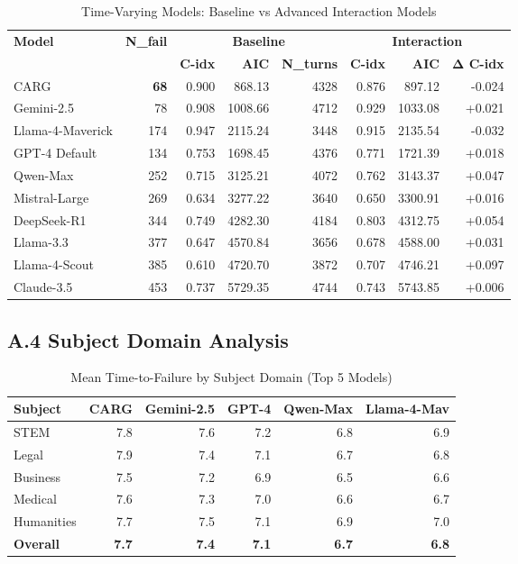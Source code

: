 \documentclass[letterpaper]{article}
\begin{document}
\begin{table}[ht]
\centering
\caption{Time-Varying Models: Baseline vs Advanced Interaction Models}
\label{tab:time_varying_complete}
\begin{tabular}{lrrrrrrr}
\toprule
\multirow{2}{*}{\textbf{Model}} & \multirow{2}{*}{\textbf{N\_fail}} & \multicolumn{3}{c}{\textbf{Baseline}} & \multicolumn{3}{c}{\textbf{Interaction}} \\
\cmidrule(lr){3-5} \cmidrule(lr){6-8}
& & \textbf{C-idx} & \textbf{AIC} & \textbf{N\_turns} & \textbf{C-idx} & \textbf{AIC} & \textbf{Δ C-idx} \\
\midrule
CARG & \textbf{68} & 0.900 & 868.13 & 4328 & 0.876 & 897.12 & -0.024 \\
Gemini-2.5 & 78 & 0.908 & 1008.66 & 4712 & 0.929 & 1033.08 & +0.021 \\
Llama-4-Maverick & 174 & 0.947 & 2115.24 & 3448 & 0.915 & 2135.54 & -0.032 \\
GPT-4 Default & 134 & 0.753 & 1698.45 & 4376 & 0.771 & 1721.39 & +0.018 \\
Qwen-Max & 252 & 0.715 & 3125.21 & 4072 & 0.762 & 3143.37 & +0.047 \\
Mistral-Large & 269 & 0.634 & 3277.22 & 3640 & 0.650 & 3300.91 & +0.016 \\
DeepSeek-R1 & 344 & 0.749 & 4282.30 & 4184 & 0.803 & 4312.75 & +0.054 \\
Llama-3.3 & 377 & 0.647 & 4570.84 & 3656 & 0.678 & 4588.00 & +0.031 \\
Llama-4-Scout & 385 & 0.610 & 4720.70 & 3872 & 0.707 & 4746.21 & +0.097 \\
Claude-3.5 & 453 & 0.737 & 5729.35 & 4744 & 0.743 & 5743.85 & +0.006 \\
\bottomrule
\end{tabular}
\end{table}

\subsection*{A.4 Subject Domain Analysis}

\begin{table}[ht]
\centering
\caption{Mean Time-to-Failure by Subject Domain (Top 5 Models)}
\label{tab:subject_analysis}
\begin{tabular}{lrrrrr}
\toprule
\textbf{Subject} & \textbf{CARG} & \textbf{Gemini-2.5} & \textbf{GPT-4} & \textbf{Qwen-Max} & \textbf{Llama-4-Mav} \\
\midrule
STEM & 7.8 & 7.6 & 7.2 & 6.8 & 6.9 \\
Legal & 7.9 & 7.4 & 7.1 & 6.7 & 6.8 \\
Business & 7.5 & 7.2 & 6.9 & 6.5 & 6.6 \\
Medical & 7.6 & 7.3 & 7.0 & 6.6 & 6.7 \\
Humanities & 7.7 & 7.5 & 7.1 & 6.9 & 7.0 \\
\midrule
\textbf{Overall} & \textbf{7.7} & \textbf{7.4} & \textbf{7.1} & \textbf{6.7} & \textbf{6.8} \\
\bottomrule
\end{tabular}
\end{table}
\end{document}
